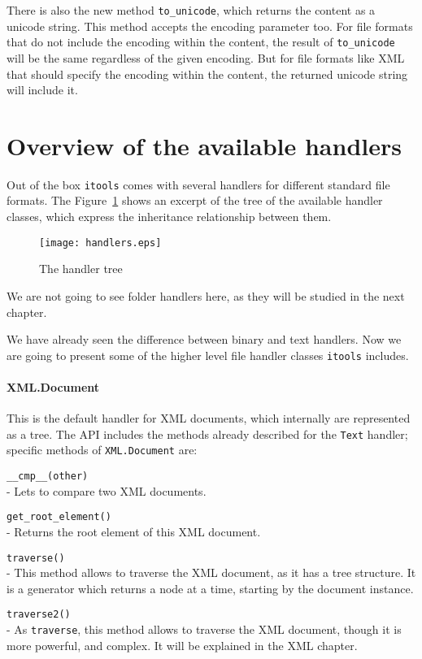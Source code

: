 There is also the new method {\tt to\_unicode}, which returns the content
as a unicode string. This method accepts the encoding parameter too. For
file formats that do not include the encoding within the content, the
result of {\tt to\_unicode} will be the same regardless of the given
encoding. But for file formats like XML that should specify the encoding
within the content, the returned unicode string will include it.



\section{Overview of the available handlers}

Out of the box {\tt itools} comes with several handlers for different
standard file formats. The Figure~\ref{Figure: handler tree} shows an
excerpt of the tree of the available handler classes, which express the
inheritance relationship between them.

\begin{figure}
  \center
  \texttt{[image: handlers.eps]}
  \caption{The handler tree}
  \label{Figure: handler tree}
\end{figure}

We are not going to see folder handlers here, as they will be studied in
the next chapter.

We have already seen the difference between binary and text handlers. Now
we are going to present some of the higher level file handler classes
{\tt itools} includes.


\paragraph{XML.Document}

This is the default handler for XML documents, which internally are
represented as a tree. The API includes the methods already described
for the {\tt Text} handler; specific methods of {\tt XML.Document} are:

\begin{api}
  {\tt \_\_cmp\_\_(other)}\\
  - Lets to compare two XML documents.

  {\tt get\_root\_element()}\\
  - Returns the root element of this XML document.

  {\tt traverse()}\\
  - This method allows to traverse the XML document, as it has a tree
    structure. It is a generator which returns a node at a time, starting
    by the document instance.

  {\tt traverse2()}\\
  - As {\tt traverse}, this method allows to traverse the XML document,
    though it is more powerful, and complex. It will be explained in the
    XML chapter.
\end{api}


